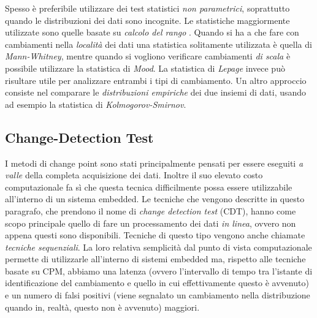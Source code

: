                          Spesso \`e preferibile utilizzare dei test
                         statistici \textit{non parametrici},
                         soprattutto quando le distribuzioni dei dati
                         sono incognite. Le statistiche maggiormente
                         utilizzate sono quelle basate su
                         \textit{calcolo del rango}
                         \cite{ross2011nonparametric}. Quando si ha a
                         che fare con cambiamenti nella
                         \textit{localit\`a} dei dati una statistica
                         solitamente utilizzata \`e quella di
                         \textit{Mann-Whitney}, mentre quando si
                         vogliono verificare cambiamenti \textit{di
                           scala} \`e possibile utilizzare la
                         statistica di \textit{Mood}. La statistica di
                         \textit{Lepage} invece pu\`o risultare utile
                         per analizzare entrambi i tipi di
                         cambiamento. Un altro approccio consiste nel
                         comparare le \textit{distribuzioni empiriche}
                         dei due insiemi di dati, usando ad esempio la
                         statistica di \textit{Kolmogorov-Smirnov}.
			 
		\subsection{Change-Detection Test}
		I metodi di change point sono stati principalmente
                pensati per essere eseguiti \textit{a valle} della
                completa acquisizione dei dati. Inoltre il suo elevato
                costo computazionale fa s\`i che questa tecnica
                difficilmente possa essere utilizzabile all'interno di
                un sistema embedded. Le tecniche che vengono descritte
                in questo paragrafo, che prendono il nome di
                \textit{change detection test} (CDT), hanno come scopo
                principale quello di fare un processamento dei dati
                \textit{in linea}, ovvero non appena questi sono
                disponibili. Tecniche di questo tipo vengono anche
                chiamate \textit{tecniche sequenziali}. La loro
                relativa semplicit\`a dal punto di vista
                computazionale permette di utilizzarle all'interno di
                sistemi embedded ma, rispetto alle tecniche basate su
                CPM, abbiamo una latenza (ovvero l'intervallo di tempo
                tra l'istante di identificazione del cambiamento e
                quello in cui effettivamente questo \`e avvenuto) e un
                numero di falsi positivi (viene segnalato un
                cambiamento nella distribuzione quando in, realt\`a,
                questo non \`e avvenuto) maggiori.
